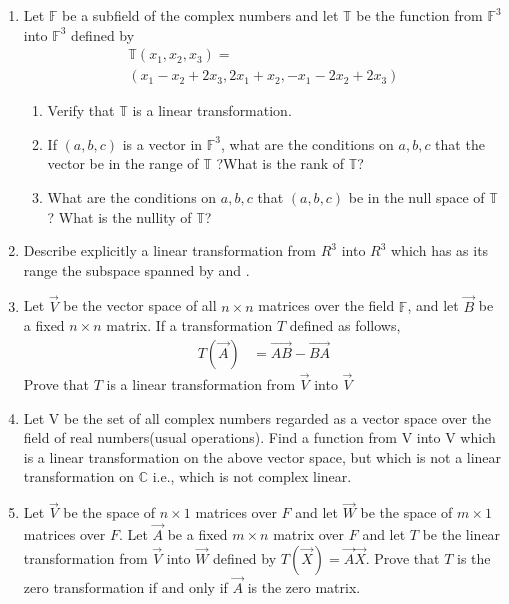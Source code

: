 \begin{enumerate}[label=\thesubsection.\arabic*.,ref=\thesubsection.\theenumi]
\item Let $\mathbb{F}$ be a subfield of the complex numbers and let $\mathbb{T}$ be the function from $\mathbb{F}^3$ into $\mathbb{F}^3$ defined by 
\begin{align}
    \mathbb{T}(x_1,x_2,x_3)=\\(x_1-x_2+2x_3,2x_1+x_2,-x_1-2x_2+2x_3)
\end{align}
\begin{enumerate}
\item  Verify that $\mathbb{T}$ is a linear transformation.\\
\item  If $(a,b,c)$ is a vector in  $\mathbb{F}^3$, what are the conditions on $a,b,c$ that the vector be in the range of  $\mathbb{T}$ ?What is the rank of  $\mathbb{T}$?\\
\item  What are the conditions on $a,b,c$ that $(a,b,c)$ be in the null space of  
$\mathbb{T}$? What is the nullity of  $\mathbb{T}$?
\end{enumerate}
\solution

\item Describe explicitly a linear transformation from $R^{3}$ into $R^{3}$ which has as its range the subspace spanned by  and .  
%
\\
\solution

\item Let $\vec{V}$ be the vector space of all $n \times n$ matrices over the field $\mathbb{F}$, and let $\vec{B}$ be a fixed $n \times n$ matrix. If a transformation $T$ defined as follows,
\begin{align*}
    T(\vec{A}) &= \vec{AB} - \vec{BA}
\end{align*}
Prove that $T$ is a linear transformation from $\vec{V}$ into $\vec{V}$
%
\solution

%
\item Let V be the set of all complex numbers regarded as a vector space over the field of real numbers(usual operations). Find a function from V into V which is a linear transformation on the above vector space, but which is not a linear transformation on $\mathbb{C}$ i.e., which is not complex linear.
%
\\
\solution

%
\item Let $\vec{V}$ be the space of $n \times 1$ matrices over $F$ and let $\vec{W}$ be the space of $m \times 1$ matrices over $F$. Let $\vec{A}$ be a fixed $m \times n$ matrix over $F$ and let $T$ be the linear transformation from $\vec{V}$ into $\vec{W}$ defined by $T(\vec{X}) = \vec{A}\vec{X}$. Prove that $T$ is the zero transformation if and only if $\vec{A}$ is the zero matrix.
%
\solution

\end{enumerate}
